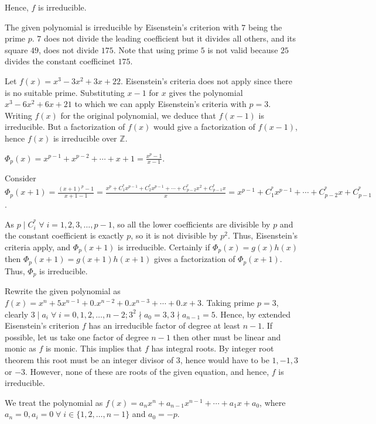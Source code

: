   Hence, $f$ is irreducible.
\item The given polynomial is irreducible by Eisenstein's criterion with $7$ being the prime $p$. $7$ does
  not divide the leading coefficient but it divides all others, and its square $49$, does not divide
  $175$. Note that using prime $5$ is not valid because $25$ divides the constant coefficinet $175$.
\item Let $f(x) = x^3 - 3x^2 + 3x + 22$. Eisenstein's criteria does not apply since there is no suitable
  prime. Substituting $x - 1$ for $x$ gives the polynomial $x^3 - 6x^2 + 6x + 21$ to which we can apply
  Eisenstein's criteria with $p = 3$. Writing $f(x)$ for the original polynomial, we deduce that $f(x - 1)$
  is irreducible. But a factorization of $f(x)$ would give a factorization of $f(x - 1)$, hence $f(x)$ is
  irreducible over $\mathbb{Z}$.
\item $\Phi_p(x) = x^{p - 1} + x^{p - 2} + \cdots + x + 1 = \frac{x^p - 1}{x - 1}$.

  Consider $\Phi_p(x + 1) = \frac{(x + 1)^p - 1}{x + 1 - 1} = \frac{x^p + C_1^^px^{p - 1} + C_2^^px^{p - 1} +
    \cdots + C_{p - 2}^^px^2 + C_{p - 1}^^p{x}}{x} = x^{p - 1} + C_1^^px^{p - 1} + \cdots + C_{p - 2}^^px + C_{p - 1}^^p$.

  As $p\mid C_i^^p\;\forall\; i = 1, 2, 3,\ldots, p - 1$, so all the lower coefficients are divisible by $p$ and
  the constant coefficient is exactly $p$, so it is not divisible by $p^2$. Thus, Eisenstein's criteria apply,
  and $\Phi_p(x + 1)$ is irreducible. Certainly if $\Phi_p(x) = g(x)h(x)$ then $\Phi_p(x + 1) = g(x + 1)h(x
  + 1)$ gives a factorization of $\Phi_p(x + 1)$. Thus, $\Phi_p$ is irreducible.
\item Rewrite the given polynomial as $f(x) = x^n + 5x^{n - 1} + 0.x^{n - 2} + 0.x^{n- 3} + \cdots + 0.x + 3$.
  Taking prime $p = 3$, clearly $3\mid a_i\;\forall\; i = 0, 1, 2, \ldots,  n - 2; 3^2\nmid a_0 = 3,
  3\nmid a_{n - 1} = 5$. Hence, by extended Eisenstein's criterion $f$ has an irreducible factor of degree
  at least $n - 1$. If possible, let us take one factor of degree $n - 1$ then other must be linear and
  monic as $f$ is monic. This implies that $f$ has integral roots. By integer root theorem this root must be
  an integer divisor of $3$, hence would have to be $1, -1, 3$ or $-3$. However, none of these are roots of
  the given equation, and hence, $f$ is irreducible.
\item We treat the polynomial as $f(x) = a_nx^n + a_{n - 1}x^{n - 1} + \cdots + a_1x + a_0$, where $a_n = 0,
  a_i = 0\;\forall\;i\in\{1, 2, \ldots, n - 1\}$ and $a_0 = -p$.

